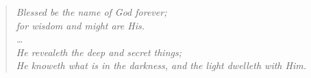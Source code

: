 
\begin{verse}
\large{\it
Blessed be the name of God forever;\\
for wisdom and might are His.\\
\dots\\
He revealeth the deep and secret things;\\
He knoweth what is in the darkness, and the light dwelleth with Him.
}
\end{verse}
